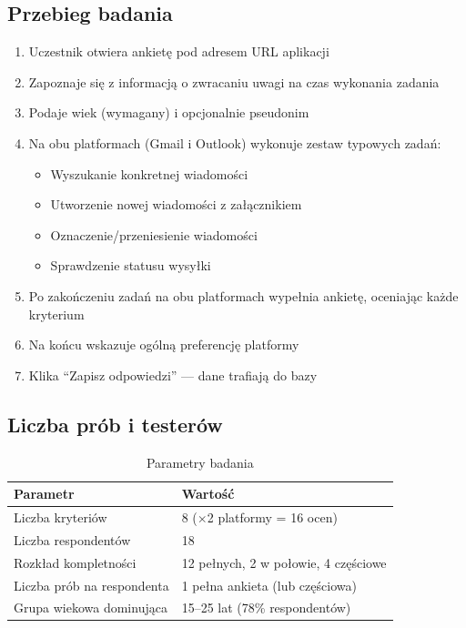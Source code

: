 \documentclass[12pt,a4paper]{article}
\begin{document}
\subsection{Przebieg badania}

\begin{enumerate}[noitemsep]
    \item Uczestnik otwiera ankietę pod adresem URL aplikacji
    \item Zapoznaje się z informacją o zwracaniu uwagi na czas wykonania zadania
    \item Podaje wiek (wymagany) i opcjonalnie pseudonim
    \item Na obu platformach (Gmail i Outlook) wykonuje zestaw typowych zadań:
    \begin{itemize}[noitemsep]
        \item Wyszukanie konkretnej wiadomości
        \item Utworzenie nowej wiadomości z załącznikiem
        \item Oznaczenie/przeniesienie wiadomości
        \item Sprawdzenie statusu wysyłki
    \end{itemize}
    \item Po zakończeniu zadań na obu platformach wypełnia ankietę, oceniając każde kryterium
    \item Na końcu wskazuje ogólną preferencję platformy
    \item Klika ``Zapisz odpowiedzi'' --- dane trafiają do bazy
\end{enumerate}

\subsection{Liczba prób i testerów}

\begin{table}[H]
\centering
\caption{Parametry badania}
\label{tab:parametry}
\begin{tabular}{|l|l|}
\hline
\textbf{Parametr} & \textbf{Wartość} \\
\hline
Liczba kryteriów & 8 ($\times$2 platformy = 16 ocen) \\
\hline
Liczba respondentów & 18 \\
\hline
Rozkład kompletności & 12 pełnych, 2 w połowie, 4 częściowe \\
\hline
Liczba prób na respondenta & 1 pełna ankieta (lub częściowa) \\
\hline
Grupa wiekowa dominująca & 15--25 lat (78\% respondentów) \\
\hline
\end{tabular}
\end{table}
\end{document}
